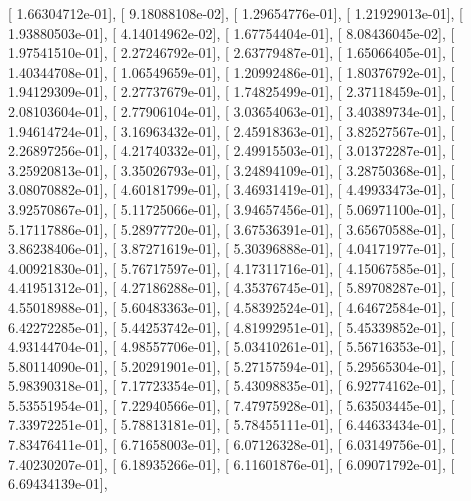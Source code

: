 \documentclass{article}
\begin{document}
       [  1.66304712e-01],
       [  9.18088108e-02],
       [  1.29654776e-01],
       [  1.21929013e-01],
       [  1.93880503e-01],
       [  4.14014962e-02],
       [  1.67754404e-01],
       [  8.08436045e-02],
       [  1.97541510e-01],
       [  2.27246792e-01],
       [  2.63779487e-01],
       [  1.65066405e-01],
       [  1.40344708e-01],
       [  1.06549659e-01],
       [  1.20992486e-01],
       [  1.80376792e-01],
       [  1.94129309e-01],
       [  2.27737679e-01],
       [  1.74825499e-01],
       [  2.37118459e-01],
       [  2.08103604e-01],
       [  2.77906104e-01],
       [  3.03654063e-01],
       [  3.40389734e-01],
       [  1.94614724e-01],
       [  3.16963432e-01],
       [  2.45918363e-01],
       [  3.82527567e-01],
       [  2.26897256e-01],
       [  4.21740332e-01],
       [  2.49915503e-01],
       [  3.01372287e-01],
       [  3.25920813e-01],
       [  3.35026793e-01],
       [  3.24894109e-01],
       [  3.28750368e-01],
       [  3.08070882e-01],
       [  4.60181799e-01],
       [  3.46931419e-01],
       [  4.49933473e-01],
       [  3.92570867e-01],
       [  5.11725066e-01],
       [  3.94657456e-01],
       [  5.06971100e-01],
       [  5.17117886e-01],
       [  5.28977720e-01],
       [  3.67536391e-01],
       [  3.65670588e-01],
       [  3.86238406e-01],
       [  3.87271619e-01],
       [  5.30396888e-01],
       [  4.04171977e-01],
       [  4.00921830e-01],
       [  5.76717597e-01],
       [  4.17311716e-01],
       [  4.15067585e-01],
       [  4.41951312e-01],
       [  4.27186288e-01],
       [  4.35376745e-01],
       [  5.89708287e-01],
       [  4.55018988e-01],
       [  5.60483363e-01],
       [  4.58392524e-01],
       [  4.64672584e-01],
       [  6.42272285e-01],
       [  5.44253742e-01],
       [  4.81992951e-01],
       [  5.45339852e-01],
       [  4.93144704e-01],
       [  4.98557706e-01],
       [  5.03410261e-01],
       [  5.56716353e-01],
       [  5.80114090e-01],
       [  5.20291901e-01],
       [  5.27157594e-01],
       [  5.29565304e-01],
       [  5.98390318e-01],
       [  7.17723354e-01],
       [  5.43098835e-01],
       [  6.92774162e-01],
       [  5.53551954e-01],
       [  7.22940566e-01],
       [  7.47975928e-01],
       [  5.63503445e-01],
       [  7.33972251e-01],
       [  5.78813181e-01],
       [  5.78455111e-01],
       [  6.44633434e-01],
       [  7.83476411e-01],
       [  6.71658003e-01],
       [  6.07126328e-01],
       [  6.03149756e-01],
       [  7.40230207e-01],
       [  6.18935266e-01],
       [  6.11601876e-01],
       [  6.09071792e-01],
       [  6.69434139e-01],
\end{document}
